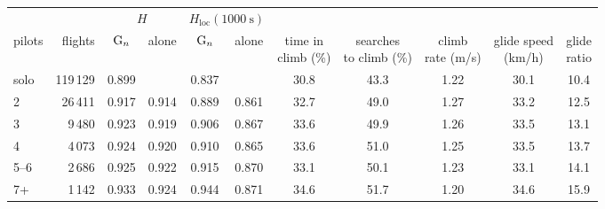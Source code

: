 \begin{tabular}{@{}l r c c c c c c c c c@{}}
\toprule
 & & \multicolumn{2}{c}{$H$} & \multicolumn{2}{c}{$H_\mathrm{loc}(1000~\mathrm{s})$} & & & & & \\
\cmidrule(lr){3-4}\cmidrule(lr){5-6}
pilots & flights & $\mathrm{G}_n$ & alone & $\mathrm{G}_n$ & alone & \makecell{time in\\climb (\%)} & \makecell{searches\\to climb (\%)} & \makecell{climb\\rate (m/s)} & \makecell{glide speed\\(km/h)} & \makecell{glide\\ratio} \\
\midrule
solo & 119\,129 & 0.899 &  & 0.837 &  & 30.8 & 43.3 & 1.22 & 30.1 & 10.4 \\
2 & 26\,411 & 0.917 & 0.914 & 0.889 & 0.861 & 32.7 & 49.0 & 1.27 & 33.2 & 12.5 \\
3 & 9\,480 & 0.923 & 0.919 & 0.906 & 0.867 & 33.6 & 49.9 & 1.26 & 33.5 & 13.1 \\
4 & 4\,073 & 0.924 & 0.920 & 0.910 & 0.865 & 33.6 & 51.0 & 1.25 & 33.5 & 13.7 \\
5--6 & 2\,686 & 0.925 & 0.922 & 0.915 & 0.870 & 33.1 & 50.1 & 1.23 & 33.1 & 14.1 \\
7+ & 1\,142 & 0.933 & 0.924 & 0.944 & 0.871 & 34.6 & 51.7 & 1.20 & 34.6 & 15.9 \\
\bottomrule
\end{tabular}
